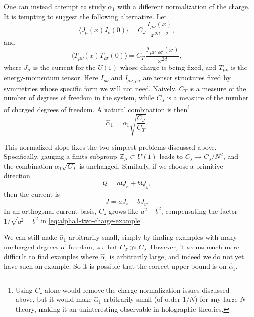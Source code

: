 \documentclass[a4paper,11pt]{article}
\begin{document}
One can instead attempt to study $\alpha_1$ with a different normalization of the charge. It is tempting to suggest the following alternative. Let
\begin{equation}
  \langle J_\mu(x)J_\nu(0)\rangle = C_J\,\frac{I_{\mu\nu}(x)}{x^{2d-2}},
\end{equation}
and
\begin{equation}
  \langle T_{\mu\nu}(x)T_{\rho\sigma}(0)\rangle = C_T\,\frac{\mathcal I_{\mu\nu,\rho\sigma}(x)}{x^{2d}} ,
\end{equation}
where $J_\mu$ is the current for the $U(1)$ whose charge is being fixed, and $T_{\mu\nu}$ is the energy-momentum tensor. Here $I_{\mu\nu}$ and $I_{\mu\nu,\rho\sigma}$ are tensor structures fixed by symmetries whose specific form we will not need. Naively, $C_T$ is a measure of the number of degrees of freedom in the system, while $C_J$ is a measure of the number of charged degrees of freedom. A natural combination is then\footnote{Using $C_J$ alone would remove the charge-normalization issues discussed above, but it would make $\hat\alpha_1$ arbitrarily small (of order $1/N$) for any large-$N$ theory, making it an uninteresting observable in holographic theories.}
\begin{equation}
  \widehat\alpha_1 = \alpha_1\sqrt{\frac{C_J}{C_T}} .
\end{equation}


This normalized slope fixes the two simplest problems discussed above. Specifically, gauging a finite subgroup $\mathbb Z_N\subset U(1)$ leads to $C_J\to C_J/N^2$,
and the combination $\alpha_1\sqrt{C_J}$ is unchanged. Similarly, if we choose
a primitive direction
\begin{equation}
  Q=aQ_x+bQ_y,
\end{equation}
then the current is
\begin{equation}
  J=aJ_x+bJ_y.
\end{equation}
In an orthogonal current basis, $C_J$ grows like $a^2+b^2$, compensating the
factor $1/\sqrt{a^2+b^2}$ in \eqref{eq:alpha1-two-charge-example}.



We can still make $\hat\alpha_1$ arbitrarily small, simply by finding examples with many uncharged degrees of freedom, so that $C_T\gg C_J$. However, it seems much more difficult to find examples where $\hat\alpha_1$ is arbitrarily large, and indeed we do not yet have such an example. So it is possible that the correct upper bound is on $\hat\alpha_1$.
\end{document}
